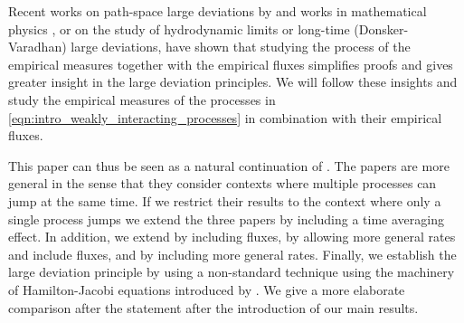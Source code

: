 \documentclass[a4paper]{article}
\numberwithin{equation}{section}
\theoremstyle{definition}
\begin{document}
\smallskip

Recent works on path-space large deviations by \cite{Re18,PaRe19} and works in mathematical physics \cite{MNW08,BeDSGaJLLa02}, or \cite{BeDSGaJLLa06,BeFaGa15,BeChFaGa18} on the study of hydrodynamic limits or long-time (Donsker-Varadhan) large deviations, have shown that studying the process of the empirical measures together with the empirical fluxes simplifies proofs and gives greater insight in the large deviation principles. We will follow these insights and study the empirical measures of the processes in \eqref{eqn:intro_weakly_interacting_processes} in combination with their empirical fluxes.

This paper can thus be seen as a natural continuation of \cite{PaRe19,Kr16b,DuRaWu16}. The papers \cite{DuRaWu16,PaRe19} are more general in the sense that they consider contexts where multiple processes can jump at the same time. If we restrict their results to the context where only a single process jumps we extend the three papers by including a time averaging effect. In addition, we  extend \cite{Kr16b} by including fluxes, \cite{DuRaWu16} by allowing more general rates and include fluxes, and \cite{PaRe19} by including more general rates. Finally, we establish the large deviation principle by using a non-standard technique using the machinery of Hamilton-Jacobi equations introduced by \cite{FK06}. We give a more elaborate comparison after the statement after the introduction of our main results.

\smallskip
\end{document}
